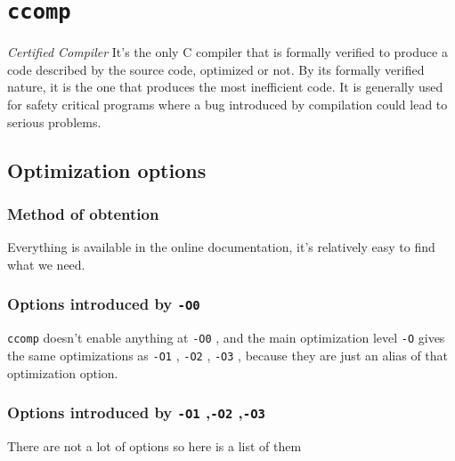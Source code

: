\documentclass{rapport}
\newcommand{\comp}{\texttt{ccomp} }
\newcommand{\optizero}{\texttt{-O0} }
\newcommand{\optione}{\texttt{-O1} }
\newcommand{\optitwo}{\texttt{-O2} }
\newcommand{\optithree}{\texttt{-O3} }
\begin{document}
\section{\comp}
\textit{Certified Compiler}\newline
It's the only C compiler that is formally verified to produce a code described by the source code, optimized or not. By its formally verified nature, it is 
the one that produces the most inefficient code. It is generally used for safety critical programs where a bug introduced by compilation could lead to serious 
problems.

\subsection{Optimization options}
\subsubsection{Method of obtention}
Everything is available in the online documentation, it's relatively easy to find what we need.
\subsubsection{Options introduced by \optizero}
\comp doesn't enable anything at \optizero, and the main optimization level \texttt{-O} gives the same optimizations as \optione, \optitwo, \optithree, because they are just an alias of that optimization option.
\subsubsection{Options introduced by \optione,\optitwo,\optithree}
There are not a lot of options so here is a list of them
\end{document}
